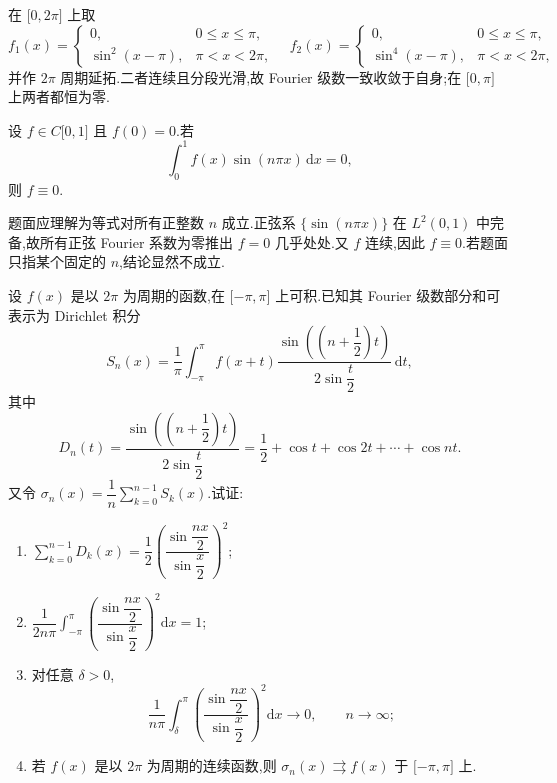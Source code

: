 \begin{solution}
    在 $\lbrack0,2\pi\rbrack$ 上取
    \[
        f_1(x)=\begin{cases}0, & 0\leq x\leq\pi, \\ \sin^2(x-\pi),&\pi<x<2\pi,
        \end{cases}
        \quad
        f_2(x)=\begin{cases}0, & 0\leq x\leq\pi, \\ \sin^4(x-\pi),&\pi<x<2\pi,
        \end{cases}
    \]
    并作 $2\pi$ 周期延拓.二者连续且分段光滑,故 Fourier 级数一致收敛于自身;在 $\lbrack0,\pi\rbrack$ 上两者都恒为零.
\end{solution}

\begin{example}
    设 $f\in C\lbrack 0,1\rbrack$ 且 $f(0)=0$.若
    \[
        \displaystyle\int_0^1f(x)\sin(n\pi x)\,\mathrm{d}x=0,
    \]
    则 $f\equiv0$.
\end{example}
\exampleblank

\begin{solution}
    题面应理解为等式对所有正整数 $n$ 成立.正弦系 $\{\sin(n\pi x)\}$ 在 $L^2(0,1)$ 中完备,故所有正弦 Fourier 系数为零推出 $f=0$ 几乎处处.又 $f$ 连续,因此 $f\equiv0$.若题面只指某个固定的 $n$,结论显然不成立.
\end{solution}

\begin{example}
    设 $f(x)$ 是以 $2\pi$ 为周期的函数,在 $\lbrack -\pi,\pi\rbrack$ 上可积.已知其 Fourier 级数部分和可表示为 Dirichlet 积分
    \[
        S_n(x)=\dfrac{1}{\pi}\int_{-\pi}^{\pi}f(x+t)
        \dfrac{\sin\left((n+\dfrac{1}{2})t\right)}{2\sin\dfrac{t}{2}}\,\mathrm{d}t,
    \]
    其中
    \[
        D_n(t)=\dfrac{\sin\left((n+\dfrac{1}{2})t\right)}{2\sin\dfrac{t}{2}}
        =\dfrac{1}{2}+\cos t+\cos2t+\cdots+\cos nt.
    \]
    又令 $\displaystyle\sigma_n(x)=\dfrac{1}{n}\sum\limits_{k=0}^{n-1}S_k(x)$.试证:
    \begin{enumerate}
        \item $\displaystyle\sum\limits_{k=0}^{n-1}D_k(x)=\dfrac{1}{2}\left(\dfrac{\sin\dfrac{nx}{2}}{\sin\dfrac{x}{2}}\right)^2$;
        \item $\displaystyle\dfrac{1}{2n\pi}\int_{-\pi}^{\pi}\left(\dfrac{\sin\dfrac{nx}{2}}{\sin\dfrac{x}{2}}\right)^2\mathrm{d}x=1$;
        \item 对任意 $\delta>0$,
              \[
                  \dfrac{1}{n\pi}\int_{\delta}^{\pi}\left(\dfrac{\sin\dfrac{nx}{2}}{\sin\dfrac{x}{2}}\right)^2\mathrm{d}x\to0,
                  \qquad n\to\infty;
              \]
        \item 若 $f(x)$ 是以 $2\pi$ 为周期的连续函数,则 $\sigma_n(x)\rightrightarrows f(x)$ 于 $\lbrack -\pi,\pi\rbrack$ 上.
    \end{enumerate}
\end{example}
\exampleblank


